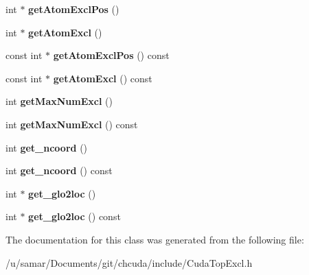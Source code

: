 \begin{DoxyCompactItemize}
int $\ast$ {\bfseries get\+Atom\+Excl\+Pos} ()
\item 
\hypertarget{classCudaTopExcl_ac7a970603a83f633f3c5e57040358b37}{}\label{classCudaTopExcl_ac7a970603a83f633f3c5e57040358b37} 
int $\ast$ {\bfseries get\+Atom\+Excl} ()
\item 
\hypertarget{classCudaTopExcl_ac7839d5905cba6c34ca891307b7de592}{}\label{classCudaTopExcl_ac7839d5905cba6c34ca891307b7de592} 
const int $\ast$ {\bfseries get\+Atom\+Excl\+Pos} () const
\item 
\hypertarget{classCudaTopExcl_a597b4e31ea5293fcdb2f989e7e7b98e5}{}\label{classCudaTopExcl_a597b4e31ea5293fcdb2f989e7e7b98e5} 
const int $\ast$ {\bfseries get\+Atom\+Excl} () const
\item 
\hypertarget{classCudaTopExcl_a49cf43f096be49fafdc2857ca57a0076}{}\label{classCudaTopExcl_a49cf43f096be49fafdc2857ca57a0076} 
int {\bfseries get\+Max\+Num\+Excl} ()
\item 
\hypertarget{classCudaTopExcl_a89f802daabb4e3eb379d85578aa8ea49}{}\label{classCudaTopExcl_a89f802daabb4e3eb379d85578aa8ea49} 
int {\bfseries get\+Max\+Num\+Excl} () const
\item 
\hypertarget{classCudaTopExcl_a802965ac0e5c4d00e97fd76b192d481e}{}\label{classCudaTopExcl_a802965ac0e5c4d00e97fd76b192d481e} 
int {\bfseries get\+\_\+ncoord} ()
\item 
\hypertarget{classCudaTopExcl_a43a81b50052812d056a80aded50be2be}{}\label{classCudaTopExcl_a43a81b50052812d056a80aded50be2be} 
int {\bfseries get\+\_\+ncoord} () const
\item 
\hypertarget{classCudaTopExcl_ab202929b636b377210612aeda758030c}{}\label{classCudaTopExcl_ab202929b636b377210612aeda758030c} 
int $\ast$ {\bfseries get\+\_\+glo2loc} ()
\item 
\hypertarget{classCudaTopExcl_adf3155356d4a8c15748451193183b9b1}{}\label{classCudaTopExcl_adf3155356d4a8c15748451193183b9b1} 
int $\ast$ {\bfseries get\+\_\+glo2loc} () const
\end{DoxyCompactItemize}


The documentation for this class was generated from the following file\+:\begin{DoxyCompactItemize}
\item 
/u/samar/\+Documents/git/chcuda/include/Cuda\+Top\+Excl.\+h\end{DoxyCompactItemize}
